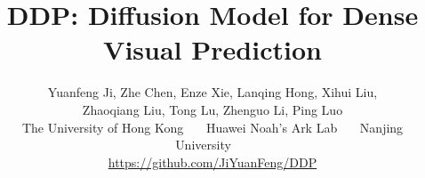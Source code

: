 \documentclass[10pt,twocolumn,letterpaper]{article}
\begin{document}
\newcommand{\baseline}[1]{\cellcolor{baselinecolor}{#1}}
\newcommand{\gray}[1]{\textcolor{gray}{#1}}

\makeatletter
\renewcommand{\paragraph}{\@startsection{paragraph}{4}{\z@}{0.2\baselineskip}{-1em}{\normalfont\normalsize\bfseries}}
\makeatother

\newcommand{\algcomment}[1]{\vspace{-\baselineskip}\noindent {\footnotesize #1\par}\vspace{\baselineskip}}
\renewcommand{\thefootnote}{}

    
\title{DDP: Diffusion Model for Dense Visual Prediction}

\author{
    Yuanfeng Ji, 
    Zhe Chen,
    Enze Xie,
    Lanqing Hong, 
    Xihui Liu, \\
    Zhaoqiang Liu,
    Tong Lu,
    Zhenguo Li,
    Ping Luo\\
    The University of Hong Kong~~~
    Huawei Noah’s Ark Lab~~~
    Nanjing University~~~ \\
    {\small \url{https://github.com/JiYuanFeng/DDP}}
}

\maketitle

\ificcvfinal\thispagestyle{empty}\fi

\end{document}
